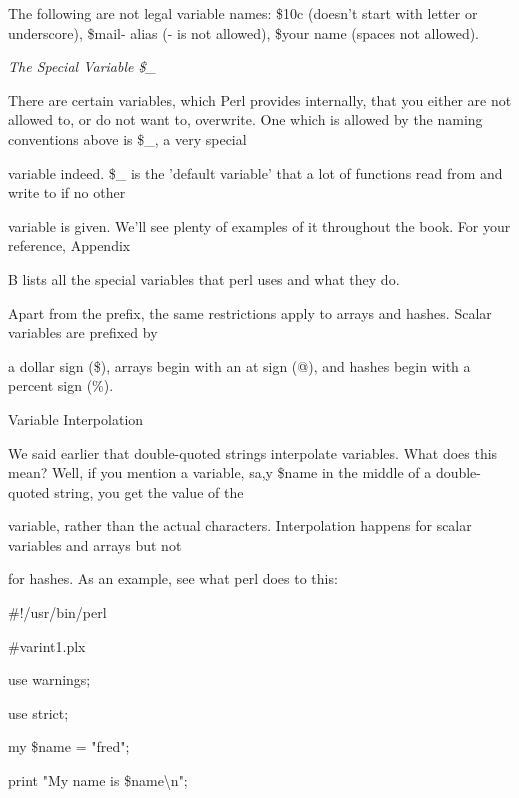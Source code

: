 \documentclass[a4paper,11pt]{book}
\begin{document}
\noindent 

\noindent The following are not legal variable names: \$10c (doesn't start with letter or underscore), \$mail- alias (- is not allowed), \$your name (spaces not allowed).

\noindent 

\noindent \textit{The Special Variable \$\_}

\noindent There are certain variables, which Perl provides internally, that you either are not allowed to, or do not want to, overwrite. One which is allowed by the naming conventions above is \$\_, a very special

\noindent variable indeed. \$\_ is the 'default variable' that a lot of functions read from and write to if no other

\noindent variable is given. We'll see plenty of examples of it throughout the book. For your reference, Appendix

\noindent B lists all the special variables that perl uses and what they do.

\noindent 

\noindent Apart from the prefix, the same restrictions apply to arrays and hashes. Scalar variables are prefixed by

\noindent a dollar sign (\$), arrays begin with an at sign (@), and hashes begin with a percent sign (\%).

\noindent 

\noindent Variable Interpolation

\noindent 

\noindent We said earlier that double-quoted strings interpolate variables. What does this mean? Well, if you mention a variable, sa,y \$name in the middle of a double-quoted string, you get the value of the

\noindent variable, rather than the actual characters. Interpolation happens for scalar variables and arrays but not

\noindent for hashes. As an example, see what perl does to this:

\noindent 

\noindent 

\noindent \#!/usr/bin/perl

\noindent \#varint1.plx

\noindent use warnings;

\noindent use strict;

\noindent my \$name = "fred";

\noindent print "My name is \$name\textbackslash n";
\end{document}
